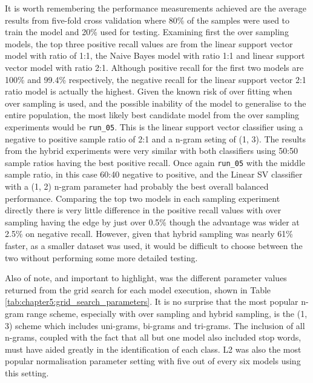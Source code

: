 It is worth remembering the performance measurements achieved are the average results from five-fold cross validation where 80\% of the samples were used to train the model and 20\% used for testing. Examining first the over sampling models, the top three positive recall values are from the linear support vector model with ratio of 1:1, the Naive Bayes model with ratio 1:1 and linear support vector model with ratio 2:1. Although positive recall for the first two models are 100\% and 99.4\% respectively, the negative recall for the linear support vector 2:1 ratio model is actually the highest. Given the known risk of over fitting when over sampling is used, and the possible inability of the model to generalise to the entire population, the most likely best candidate model from the over sampling experiments would be \verb|run_05|. This is the linear support vector classifier using a negative to positive sample ratio of 2:1 and a n-gram seting of (1, 3). The results from the hybrid experiments were very similar with both classifiers using 50:50 sample ratios having the best positive recall. Once again \verb|run_05| with the middle sample ratio, in this case 60:40 negative to positive, and the Linear SV classifier with a (1, 2) n-gram parameter had probably the best overall balanced performance. Comparing the top two models in each sampling experiment directly there is very little difference in the positive recall values with over sampling having the edge by just over 0.5\% though the advantage was wider at 2.5\% on negative recall. However, given that hybrid sampling was nearly 61\% faster, as a smaller dataset was used, it would be difficult to choose between the two without performing some more detailed testing.

Also of note, and important to highlight, was the different parameter values returned from the grid search for each model execution, shown in Table \ref{tab:chapter5:grid_search_parameters}. It is no surprise that the most popular n-gram range scheme, especially with over sampling and hybrid sampling, is the (1, 3) scheme which includes uni-grams, bi-grams and tri-grams. The inclusion of all n-grams, coupled with the fact that all but one model also included stop words, must have aided greatly in the identification of each class. L2 was also the most popular normalisation parameter setting with five out of every six models using this setting.   

